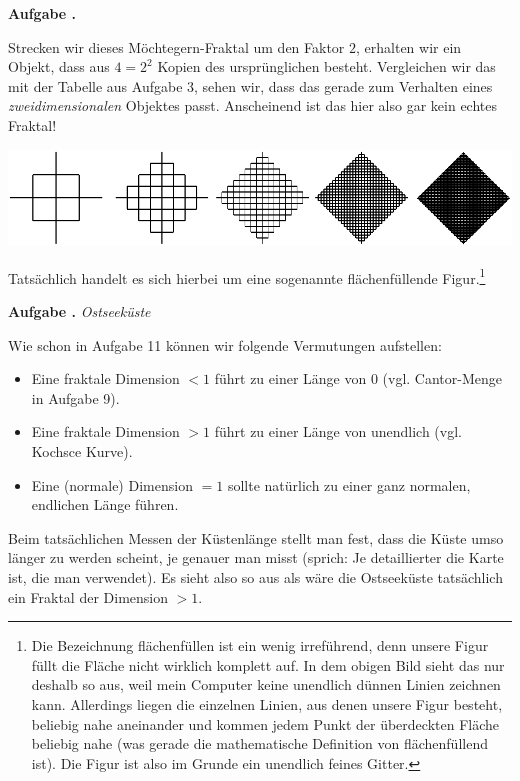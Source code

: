 \documentclass[a4paper,ngerman,12pt]{scrartcl}
\theoremstyle{definition}
\theoremstyle{plain}
\theoremstyle{remark}
\newlength{\aufgabenskip}
\newcounter{aufgabennummer}
\newenvironment{aufgabe}[1]{
  \addtocounter{aufgabennummer}{1}
  \textbf{Aufgabe \theaufgabennummer.} \emph{#1} \par
}{\vspace{\aufgabenskip}}
\begin{document}
\begin{aufgabe}{}
	Strecken wir dieses Möchtegern-Fraktal um den Faktor $2$, erhalten wir ein Objekt, dass aus $4 = 2^2$ Kopien des ursprünglichen besteht. Vergleichen wir das mit der Tabelle aus Aufgabe 3, sehen wir, dass das gerade zum Verhalten eines \emph{zweidimensionalen} Objektes passt. Anscheinend ist das hier also gar kein \glqq echtes Fraktal\grqq!
	
	\begin{center}
		\includegraphics[width=.6\textwidth]{Bilder/Nicht-Fraktal-mehr-Schritte.pdf}
	\end{center}	
	
	Tatsächlich handelt es sich hierbei um eine sogenannte \glqq flächenfüllende\grqq{} Figur.\footnote{Die Bezeichnung \glqq flächenfüllen\grqq{} ist ein wenig irreführend, denn unsere Figur füllt die Fläche nicht wirklich komplett auf. In dem obigen Bild sieht das nur deshalb so aus, weil mein Computer keine unendlich dünnen Linien zeichnen kann. Allerdings liegen die einzelnen Linien, aus denen unsere Figur besteht, \glqq beliebig nahe aneinander\grqq{} und kommen jedem Punkt der überdeckten Fläche \glqq beliebig nahe (was gerade die mathematische Definition von \glqq flächenfüllend\grqq{} ist). Die Figur ist also im Grunde ein unendlich feines Gitter.} 
\end{aufgabe}

\begin{aufgabe}{Ostseeküste}
	Wie schon in Aufgabe 11 können wir folgende Vermutungen aufstellen:
	\begin{itemize}
		\item Eine fraktale Dimension $< 1$ führt zu einer Länge von $0$ (vgl. Cantor-Menge in Aufgabe 9).
		\item Eine fraktale Dimension $> 1$ führt zu einer Länge von unendlich (vgl. Kochsce Kurve).
		\item Eine (normale) Dimension $= 1$ sollte natürlich zu einer ganz normalen, endlichen Länge führen.
	\end{itemize}
	
	Beim tatsächlichen Messen der Küstenlänge stellt man fest, dass die Küste umso länger zu werden scheint, je genauer man misst (sprich: Je detaillierter die Karte ist, die man verwendet). Es sieht also so aus als wäre die Ostseeküste tatsächlich ein Fraktal der Dimension $> 1$.
\end{aufgabe}
\end{document}

